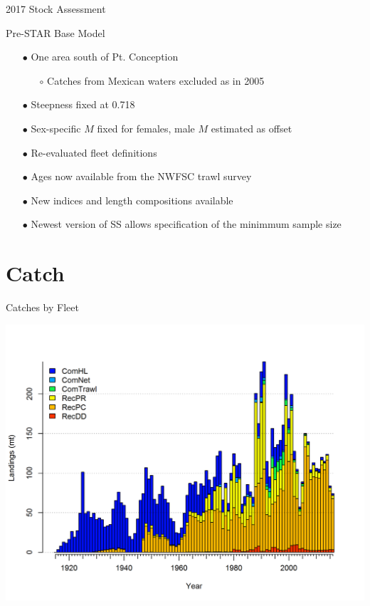 \documentclass[ignorenonframetext,]{beamer}
\begin{document}
\begin{frame}{2017 Stock Assessment}

Pre-STAR Base Model

\begin{itemize}
\item[$\bullet$] One area south of Pt. Conception 
\begin{itemize}
\item[$\circ$] Catches from Mexican waters excluded as in 2005
\end{itemize}
\item[$\bullet$] Steepness fixed at 0.718
\item[$\bullet$] Sex-specific $M$ fixed for females, male $M$ estimated as offset
\item[$\bullet$] Re-evaluated fleet definitions
\item[$\bullet$] Ages now available from the NWFSC trawl survey
\item[$\bullet$] New indices and length compositions available
\item[$\bullet$] Newest version of SS allows specification of the minimmum sample size
\end{itemize}

\end{frame}

\section{Catch}\label{catch}

\begin{frame}{Catches by Fleet}

\centering
\includegraphics{r4ss/plots_mod1/catch2 landings stacked.png}

\end{frame}
\end{document}

